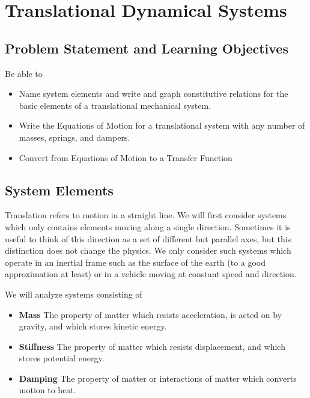 %
%
%

\chapter{Translational Dynamical Systems}

\section{Problem Statement and Learning Objectives}
Be able to
\begin{itemize}
  \item Name system elements and write and graph constitutive relations for the basic elements
  of a translational mechanical system.
  \item Write the Equations of Motion for a translational system with any number of masses, springs, and dampers.
  \item Convert from Equations of Motion to a Transfer Function
\end{itemize}

\section{System Elements}

Translation refers to motion in a straight line.   We will first consider systems which only contains elements moving along a single direction.  Sometimes it is useful to think of this direction as a set of different but parallel axes, but this distinction does not change the physics. We only consider such systems which operate in an inertial frame such as the surface of the earth (to a good approximation at least) or in a vehicle moving at constant speed and direction.


We will analyze systems consisting of
\begin{itemize}
  \item {\bf Mass}        The property of matter which resists acceleration, is acted on by gravity, and which stores kinetic energy.
  \item {\bf Stiffness}   The property of matter which resists displacement, and which stores potential energy.
  \item {\bf Damping}     The property of matter or interactions of matter which converts motion to heat.
\end{itemize}

